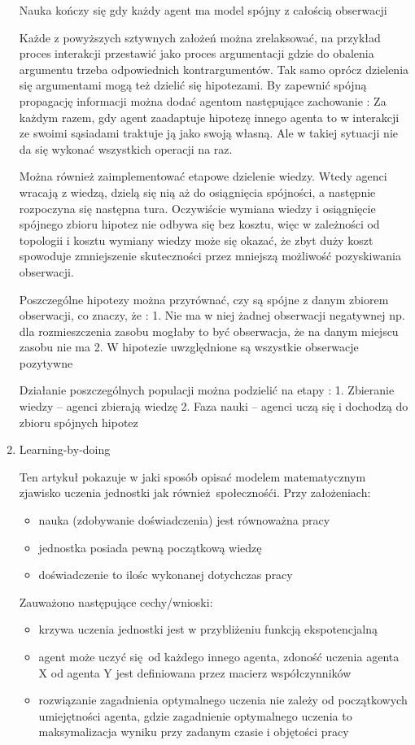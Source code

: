 \documentclass[11pt]{aghdpl}
\begin{document}
\begin{enumerate}
Nauka kończy się gdy każdy agent ma model spójny z całością obserwacji

Każde z powyższych sztywnych założeń można zrelaksować, na przykład proces interakcji przestawić jako proces argumentacji gdzie do obalenia argumentu trzeba odpowiednich kontrargumentów. Tak samo oprócz dzielenia się argumentami mogą też dzielić się hipotezami.
By zapewnić spójną propagację informacji można dodać agentom następujące zachowanie : Za każdym razem, gdy agent zaadaptuje hipotezę innego agenta to w interakcji ze swoimi sąsiadami traktuje ją jako swoją własną. Ale w takiej sytuacji nie da się wykonać wszystkich operacji na raz.

Można również zaimplementować etapowe dzielenie wiedzy. Wtedy agenci wracają z wiedzą, dzielą się nią aż do osiągnięcia spójności, a następnie rozpoczyna się następna tura. Oczywiście wymiana wiedzy i osiągnięcie spójnego zbioru hipotez nie odbywa się bez kosztu, więc w zależności od topologii i kosztu wymiany wiedzy może się okazać, że zbyt duży koszt spowoduje zmniejszenie skuteczności przez mniejszą możliwość pozyskiwania obserwacji.

Poszczególne hipotezy można przyrównać, czy są spójne z danym zbiorem obserwacji, co znaczy, że :
1.	Nie ma w niej żadnej obserwacji negatywnej np. dla rozmieszczenia zasobu mogłaby to być obserwacja, że na danym miejscu zasobu nie ma
2.	W hipotezie uwzględnione są wszystkie obserwacje pozytywne

Działanie poszczególnych populacji można podzielić na etapy :
1.	Zbieranie wiedzy – agenci zbierają wiedzę
2.	Faza nauki – agenci uczą się i dochodzą do zbioru spójnych hipotez

\item Learning-by-doing \cite{LearningByDoing}

Ten artykuł pokazuje w jaki sposób opisać modelem matematycznym zjawisko uczenia jednostki jak również społecznośći. Przy założeniach:

\begin{itemize}
        \item nauka (zdobywanie doświadczenia) jest równoważna pracy
        \item jednostka posiada pewną początkową wiedzę
        \item doświadczenie to ilośc wykonanej dotychczas pracy
\end{itemize}

Zauważono następujące cechy/wnioski:

\begin{itemize}
        \item krzywa uczenia jednostki jest w przybliżeniu funkcją ekspotencjalną
        \item agent może uczyć się od każdego innego agenta, zdoność uczenia agenta X od agenta Y jest definiowana przez macierz  współczynników
        \item rozwiązanie zagadnienia optymalnego uczenia nie zależy od początkowych umiejętności agenta, gdzie zagadnienie optymalnego uczenia to maksymalizacja wyniku przy zadanym czasie i objętości pracy
\end{itemize}


\end{enumerate}
\end{document}
